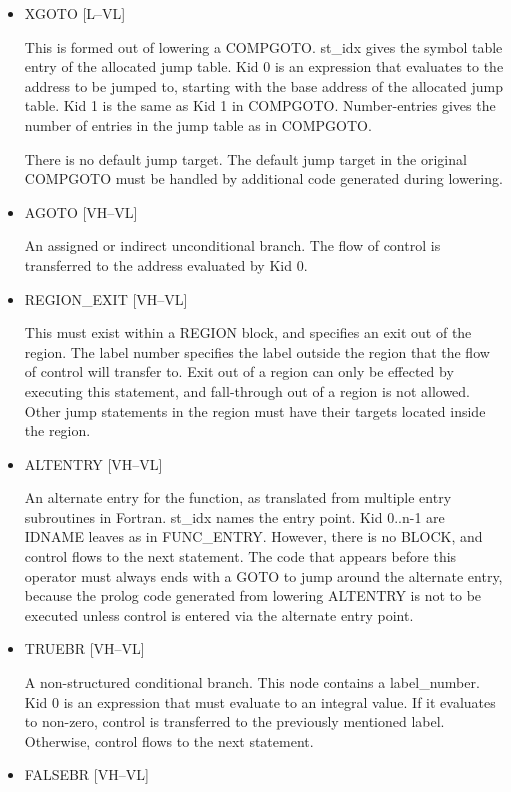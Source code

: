 \documentclass{article}
\begin{document}
\begin{itemize}
\item  XGOTO [L--VL]

This is formed out of lowering a COMPGOTO. st\_idx gives the symbol
table entry of the allocated jump table. Kid 0 is an expression
that evaluates
to the address to be jumped to, starting with the base address of
the allocated jump table. Kid 1 is the same as Kid 1 in
COMPGOTO. Number-entries gives the number of entries in the jump
table as in
COMPGOTO.


There is no default jump target. The default jump target in the
original COMPGOTO must be handled by additional code generated
during lowering.

\item  AGOTO \hfill [VH--VL]

An assigned or indirect unconditional branch. The flow of control
is transferred to the address evaluated by Kid 0.

\item  REGION\_EXIT \hfill [VH--VL]

This must exist within a REGION block, and specifies an exit out
of the region. The label number specifies the label outside the
region that the
flow of control will transfer to. Exit out of a region can only be
effected by executing this statement, and fall-through out of a
region is not allowed. Other jump statements in the region must
have their targets located inside the region.

\item  ALTENTRY \hfill [VH--VL]

An alternate entry for the function, as translated from multiple
entry subroutines in Fortran. st\_idx names the entry point. Kid
0..n-1 are
IDNAME leaves as in FUNC\_ENTRY. However, there is no BLOCK, and
control flows to the next statement. The code that appears before
this operator
must always ends with a GOTO to jump around the alternate entry,
because the prolog code generated from lowering
ALTENTRY is not to be executed unless control is entered via the
alternate entry point.

\item  TRUEBR \hfill [VH--VL]

A non-structured conditional branch. This node contains a
label\_number. Kid 0 is an expression that must evaluate to an integral
value. If it evaluates to non-zero, control is transferred to the
previously mentioned label. Otherwise, control flows to the next
statement.

\item  FALSEBR \hfill [VH--VL]


\end{itemize}
\end{document}
